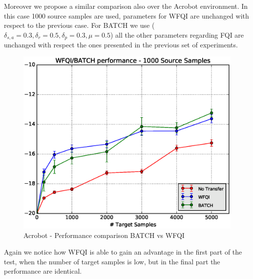     \noindent Moreover we propose a similar comparison also over the Acrobot environment. In this case 1000 source samples are used,
    parameters for WFQI are unchanged with respect to the previous case. For BATCH we use ($\delta_{s,a}=0.3, \delta_{r}=0.5, \delta_{p}=0.3, \mu=0.5$) all
    the other parameters regarding FQI are unchanged with respect the ones presented in the previous set of experiments.
    \begin{figure}[H]
      \centering
      \includegraphics[scale=0.5]{images/WFQIPerfCMPacro.eps}
      \caption{Acrobot - Performance comparison BATCH vs WFQI}
      \label{}
    \end{figure}
    \noindent Again we notice how WFQI is able to gain an advantage in the first part of the test, when the number of
    target samples is low, but in the final part the performance are identical.


